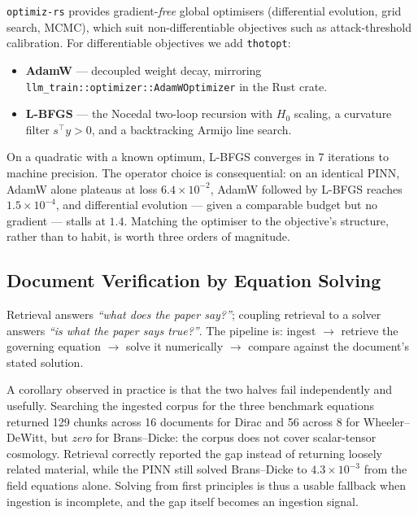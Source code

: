 \documentclass[11pt,a4paper]{article}
\theoremstyle{plain}
\theoremstyle{definition}
\begin{document}
\texttt{optimiz-rs} provides gradient-\emph{free} global optimisers
(differential evolution, grid search, MCMC), which suit non-differentiable
objectives such as attack-threshold calibration. For differentiable
objectives we add \texttt{thotopt}:

\begin{itemize}
    \item \textbf{AdamW} --- decoupled weight decay, mirroring
          \texttt{llm\_train::optimizer::AdamWOptimizer} in the Rust crate.
    \item \textbf{L-BFGS} --- the Nocedal two-loop recursion with
          $H_0$ scaling, a curvature filter $s^\top y > 0$, and a
          backtracking Armijo line search.
\end{itemize}

On a quadratic with a known optimum, L-BFGS converges in 7 iterations to
machine precision. The operator choice is consequential: on an identical PINN,
AdamW alone plateaus at loss $6.4\times10^{-2}$, AdamW followed by L-BFGS
reaches $1.5\times10^{-4}$, and differential evolution --- given a comparable
budget but no gradient --- stalls at $1.4$. Matching the optimiser to the
objective's structure, rather than to habit, is worth three orders of
magnitude.

\subsection{Document Verification by Equation Solving}

Retrieval answers \emph{``what does the paper say?''}; coupling retrieval to a
solver answers \emph{``is what the paper says true?''}. The pipeline is:
ingest $\rightarrow$ retrieve the governing equation $\rightarrow$ solve it
numerically $\rightarrow$ compare against the document's stated solution.

A corollary observed in practice is that the two halves fail independently and
usefully. Searching the ingested corpus for the three benchmark equations
returned 129 chunks across 16 documents for Dirac and 56 across 8 for
Wheeler--DeWitt, but \emph{zero} for Brans--Dicke: the corpus does not cover
scalar-tensor cosmology. Retrieval correctly reported the gap instead of
returning loosely related material, while the PINN still solved Brans--Dicke
to $4.3\times10^{-3}$ from the field equations alone. Solving from first
principles is thus a usable fallback when ingestion is incomplete, and the
gap itself becomes an ingestion signal.
\end{document}
